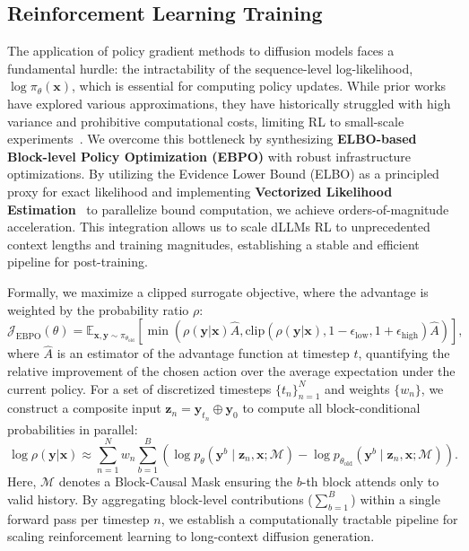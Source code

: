 \subsection{Reinforcement Learning Training}

The application of policy gradient methods to diffusion models faces a fundamental hurdle: the intractability of the sequence-level log-likelihood, $\log \pi_{\theta}(\bm{x})$, which is essential for computing policy updates. While prior works have explored various approximations, they have historically struggled with high variance and prohibitive computational costs, limiting RL to small-scale experiments~\citep{wang2025revolutionizing,ou_principled_2025,wang2025spg}.
We overcome this bottleneck by synthesizing \textbf{ELBO-based Block-level Policy Optimization (EBPO)} with robust infrastructure optimizations. By utilizing the Evidence Lower Bound (ELBO) as a principled proxy for exact likelihood and implementing \textbf{Vectorized Likelihood Estimation}~\citep{Blockdiffusion2025} to parallelize bound computation, we achieve orders-of-magnitude acceleration. This integration allows us to scale dLLMs RL to unprecedented context lengths and training magnitudes, establishing a stable and efficient pipeline for post-training.

Formally, we maximize a clipped surrogate objective, where the advantage is weighted by the probability ratio $\rho$:
\begin{equation}\label{eq:ebpo_objective}
\mathcal{J}_{\text{EBPO}}(\theta) = \mathbb{E}_{\bm{x}, \bm{y} \sim \pi_{\theta_{\text{old}}}} \left[ \min \left( \rho(\bm{y}|\bm{x}) \hat{A}, \text{clip}(\rho(\bm{y}|\bm{x}), 1-\epsilon_{\text{low}}, 1+\epsilon_{\text{high}}) \hat{A} \right) \right],
\end{equation}
where $\hat{A}$ is an estimator of the advantage function at timestep $t$, quantifying the relative improvement of the chosen action over the average expectation under the current policy.
For a set of discretized timesteps $\{t_n\}_{n=1}^N$ and weights $\{w_n\}$, we construct a composite input $\bm{z}_n = \bm{y}_{t_n} \oplus \bm{y}_0$ to compute all block-conditional probabilities in parallel:
\begin{equation}
\log \rho(\bm{y}|\bm{x}) \approx \sum_{n=1}^N w_n \sum_{b=1}^B \left( \log p_\theta(\bm{y}^b \mid \bm{z}_n, \bm{x}; \mathcal{M}) - \log p_{\theta_{\text{old}}}(\bm{y}^b \mid \bm{z}_n, \bm{x}; \mathcal{M}) \right).
\end{equation}
Here, $\mathcal{M}$ denotes a Block-Causal Mask ensuring the $b$-th block attends only to valid history. By aggregating block-level contributions ($\sum_{b=1}^B$) within a single forward pass per timestep $n$, we establish a computationally tractable pipeline for scaling reinforcement learning to long-context diffusion generation.

